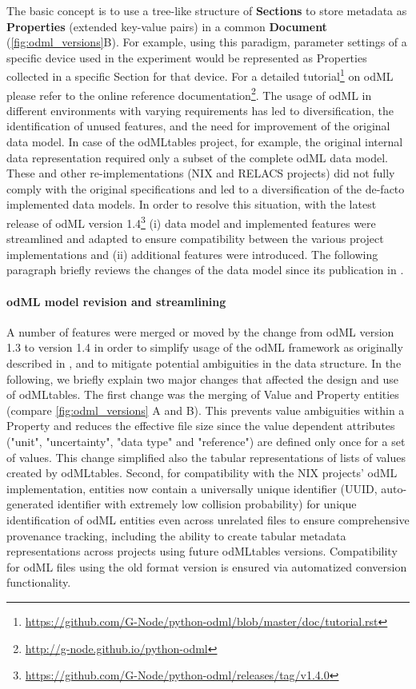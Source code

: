 {The basic concept is to use a tree-like structure of \textbf{Sections} to store metadata as \textbf{Properties} (extended key-value pairs) in a common \textbf{Document} (\cref{fig:odml_versions}B). For example, using this paradigm,  parameter settings of a specific device used in the experiment would be represented as Properties collected in a specific Section for that device. For a detailed tutorial\footnote{\url{https://github.com/G-Node/python-odml/blob/master/doc/tutorial.rst}} on odML please refer to the online reference documentation\footnote{\url{http://g-node.github.io/python-odml}}. The usage of odML in different environments with varying requirements has led to diversification, the identification of unused features, and the need for improvement of the original data model. In case of the odMLtables project, for example, the original internal data representation required only a subset of the complete odML data model. These and other re-implementations (NIX and RELACS projects) did not fully comply with the original specifications and led to a diversification of the de-facto implemented data models. In order to resolve this situation, with the latest release of odML version 1.4\footnote{\url{https://github.com/G-Node/python-odml/releases/tag/v1.4.0}} (i) data model and implemented features were streamlined and adapted to ensure compatibility between the various project implementations and (ii) additional features were introduced. The following paragraph briefly reviews the changes of the data model since its publication in \cite{Grewe_2011}.

\paragraph{odML model revision and streamlining}
\label{sec:odml_model_revision}
A number of features were merged or moved by the change from odML version 1.3 to version 1.4 in order to simplify usage of the odML framework as originally described in \citet{Grewe_2011}, and to mitigate potential ambiguities in the data structure. In the following, we briefly explain two major changes that affected the design and use of odMLtables. The first change was the merging of Value and Property entities (compare \cref{fig:odml_versions} A and B). This prevents value ambiguities within a Property and reduces the effective file size since the value dependent attributes ("unit", "uncertainty", "data type" and "reference") are defined only once for a set of values. This change simplified also the tabular representations of lists of values created by odMLtables. Second, for compatibility with the NIX projects' odML implementation, entities now contain a universally unique identifier (UUID, auto-generated identifier with extremely low collision probability) for unique identification of odML entities even across unrelated files to ensure comprehensive provenance tracking, including the ability to create tabular metadata representations across projects using future odMLtables versions. Compatibility for odML files using the old format version is ensured via automatized conversion functionality.

}
